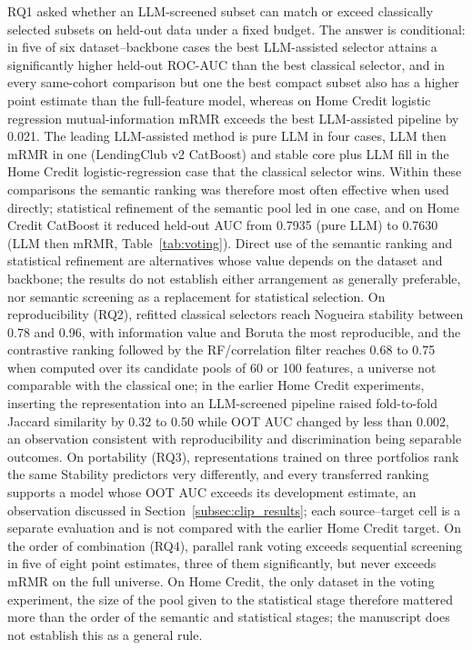 \documentclass[final,5p,twocolumn]{elsarticle}
\begin{document}
RQ1 asked whether an LLM-screened subset can match or exceed classically selected subsets on held-out data under a fixed budget. The answer is conditional: in five of six dataset--backbone cases the best LLM-assisted selector attains a significantly higher held-out ROC-AUC than the best classical selector, and in every same-cohort comparison but one the best compact subset also has a higher point estimate than the full-feature model, whereas on Home Credit logistic regression mutual-information mRMR exceeds the best LLM-assisted pipeline by 0.021. The leading LLM-assisted method is pure LLM in four cases, LLM then mRMR in one (LendingClub v2 CatBoost) and stable core plus LLM fill in the Home Credit logistic-regression case that the classical selector wins. Within these comparisons the semantic ranking was therefore most often effective when used directly; statistical refinement of the semantic pool led in one case, and on Home Credit CatBoost it reduced held-out AUC from 0.7935 (pure LLM) to 0.7630 (LLM then mRMR, Table~\ref{tab:voting}). Direct use of the semantic ranking and statistical refinement are alternatives whose value depends on the dataset and backbone; the results do not establish either arrangement as generally preferable, nor semantic screening as a replacement for statistical selection. On reproducibility (RQ2), refitted classical selectors reach Nogueira stability between 0.78 and 0.96, with information value and Boruta the most reproducible, and the contrastive ranking followed by the RF/correlation filter reaches 0.68 to 0.75 when computed over its candidate pools of 60 or 100 features, a universe not comparable with the classical one; in the earlier Home Credit experiments, inserting the representation into an LLM-screened pipeline raised fold-to-fold Jaccard similarity by 0.32 to 0.50 while OOT AUC changed by less than 0.002, an observation consistent with reproducibility and discrimination being separable outcomes. On portability (RQ3), representations trained on three portfolios rank the same Stability predictors very differently, and every transferred ranking supports a model whose OOT AUC exceeds its development estimate, an observation discussed in Section~\ref{subsec:clip_results}; each source--target cell is a separate evaluation and is not compared with the earlier Home Credit target. On the order of combination (RQ4), parallel rank voting exceeds sequential screening in five of eight point estimates, three of them significantly, but never exceeds mRMR on the full universe. On Home Credit, the only dataset in the voting experiment, the size of the pool given to the statistical stage therefore mattered more than the order of the semantic and statistical stages; the manuscript does not establish this as a general rule.
\end{document}
